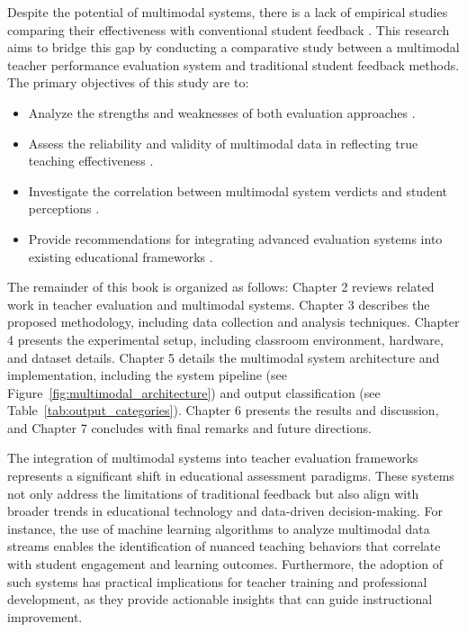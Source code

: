 Despite the potential of multimodal systems, there is a lack of empirical studies comparing their effectiveness with conventional student feedback \cite{Ginsburg2022NecessaryBI}. This research aims to bridge this gap by conducting a comparative study between a multimodal teacher performance evaluation system and traditional student feedback methods. The primary objectives of this study are to:

\begin{itemize}
    \item Analyze the strengths and weaknesses of both evaluation approaches \cite{Heffernan2022, carvalho2022biases, 10.1007/978-981-99-9109-9_7}.
    \item Assess the reliability and validity of multimodal data in reflecting true teaching effectiveness \cite{Wang2022, Yang2022, YE2023108915}.
    \item Investigate the correlation between multimodal system verdicts and student perceptions \cite{Ajmal2024, Husain2016, falcon2024discourse}.
    \item Provide recommendations for integrating advanced evaluation systems into existing educational frameworks \cite{Ginsburg2022NecessaryBI, 10.1007/978-981-99-9109-9_7, hou2024encouragement}.
\end{itemize}

The remainder of this book is organized as follows: Chapter 2 reviews related work in teacher evaluation and multimodal systems. Chapter 3 describes the proposed methodology, including data collection and analysis techniques. Chapter 4 presents the experimental setup, including classroom environment, hardware, and dataset details. Chapter 5 details the multimodal system architecture and implementation, including the system pipeline (see Figure~\ref{fig:multimodal_architecture}) and output classification (see Table~\ref{tab:output_categories}). Chapter 6 presents the results and discussion, and Chapter 7 concludes with final remarks and future directions.

The integration of multimodal systems into teacher evaluation frameworks represents a significant shift in educational assessment paradigms. These systems not only address the limitations of traditional feedback but also align with broader trends in educational technology and data-driven decision-making. For instance, the use of machine learning algorithms to analyze multimodal data streams enables the identification of nuanced teaching behaviors that correlate with student engagement and learning outcomes. Furthermore, the adoption of such systems has practical implications for teacher training and professional development, as they provide actionable insights that can guide instructional improvement.

